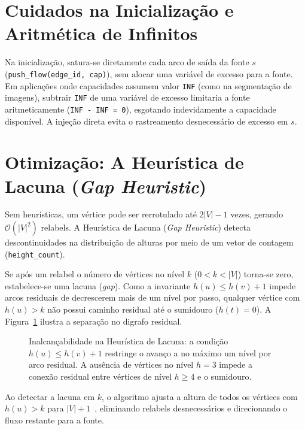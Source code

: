 \section{Cuidados na Inicialização e Aritmética de Infinitos}

Na inicialização, satura-se diretamente cada arco de saída da fonte $s$ (\lstinline{push_flow(edge_id, cap)}), sem alocar uma variável de excesso para a fonte. Em aplicações onde capacidades assumem valor \lstinline{INF} (como na segmentação de imagens), subtrair \lstinline{INF} de uma variável de excesso limitaria a fonte aritmeticamente (\lstinline{INF - INF = 0}), esgotando indevidamente a capacidade disponível. A injeção direta evita o rastreamento desnecessário de excesso em $s$.


\section{Otimização: A Heurística de Lacuna (\textit{Gap Heuristic})}\label{sec:push_relabel_gap}

Sem heurísticas, um vértice pode ser rerrotulado até $2|V|-1$ vezes, gerando $\mathcal{O}(|V|^2)$ relabels. A Heurística de Lacuna (\textit{Gap Heuristic}) detecta descontinuidades na distribuição de alturas por meio de um vetor de contagem (\lstinline{height_count}).

Se após um relabel o número de vértices no nível $k$ ($0 < k < |V|$) torna-se zero, estabelece-se uma lacuna (\textit{gap}). Como a invariante $h(u) \le h(v) + 1$ impede arcos residuais de decrescerem mais de um nível por passo, qualquer vértice com $h(u) > k$ não possui caminho residual até o sumidouro ($h(t) = 0$). A Figura~\ref{fig:gap_prova} ilustra a separação no digrafo residual.

\begin{figure}[!ht]
\centering

\caption{Inalcançabilidade na Heurística de Lacuna: a condição $h(u) \le h(v) + 1$ restringe o avanço a no máximo um nível por arco residual. A ausência de vértices no nível $h=3$ impede a conexão residual entre vértices de nível $h \ge 4$ e o sumidouro.}
\label{fig:gap_prova}
\end{figure}

Ao detectar a lacuna em $k$, o algoritmo ajusta a altura de todos os vértices com $h(u) > k$ para $|V| + 1$~\cite{korte2018combinatorial}, eliminando relabels desnecessários e direcionando o fluxo restante para a fonte.

